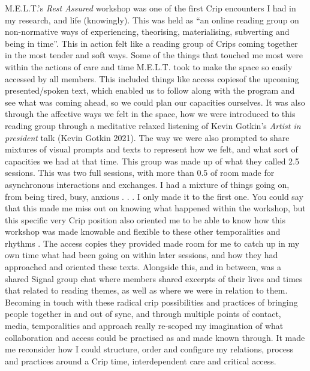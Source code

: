 M.E.L.T.'s \emph{Rest Assured} workshop was one of the first Crip
encounters I had in my research, and life (knowingly). This was held as
``an online reading group on non-normative ways of experiencing,
theorising, materialising, subverting and being in time''. This in
action felt like a reading group of Crips coming together in the most
tender and soft ways. Some of the things that touched me most were
within the actions of care and time M.E.L.T. took to make the space so
easily accessed by all members. This included things like access
copiesof the upcoming presented/spoken text, which enabled us to follow
along with the program and see what was coming ahead, so we could plan
our capacities ourselves. It was also through the affective ways we felt
in the space, how we were introduced to this reading group through a
meditative relaxed listening of Kevin Gotkin's \emph{Artist in
president} talk (Kevin Gotkin 2021). The way we were also prompted to
share mixtures of visual prompts and texts to represent how we felt, and
what sort of capacities we had at that time. This group was made up of
what they called 2.5 sessions. This was two full sessions, with more
than 0.5 of room made for asynchronous interactions and exchanges. I had
a mixture of things going on, from being tired, busy, anxious . . . I
only made it to the first one. You could say that this made me miss out
on knowing what happened within the workshop, but this specific very
Crip position also oriented me to be able to know how this workshop was
made knowable and flexible to these other temporalities and rhythms .
The access copies they provided made room for me to catch up in my own
time what had been going on within later sessions, and how they had
approached and oriented these texts. Alongside this, and in between, was
a shared Signal group chat where members shared excerpts of their lives
and times that related to reading themes, as well as where we were in
relation to them. Becoming in touch with these radical crip
possibilities and practices of bringing people together in and out of
sync, and through multiple points of contact, media, temporalities and
approach really re-scoped my imagination of what collaboration and
access could be practised as and made known through. It made me
reconsider how I could structure, order and configure my relations,
process and practices around a Crip time, interdependent care and
critical access.

